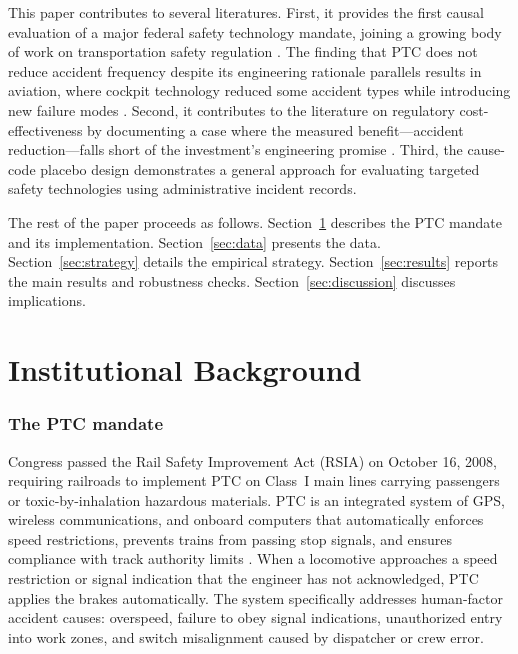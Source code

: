 \documentclass[12pt]{article}
\begin{document}
This paper contributes to several literatures. First, it provides the first causal evaluation of a major federal safety technology mandate, joining a growing body of work on transportation safety regulation \citep{Anderson2014, Auffhammer2016, Cohen2003DrunkDriving, DeAngelo2017, Greenstone2002}. The finding that PTC does not reduce accident frequency despite its engineering rationale parallels results in aviation, where cockpit technology reduced some accident types while introducing new failure modes \citep{Rankin1997CRM}. Second, it contributes to the literature on regulatory cost-effectiveness by documenting a case where the measured benefit---accident reduction---falls short of the investment's engineering promise \citep{Viscusi1992RiskRegulation, Hahn2005CostBenefit}. Third, the cause-code placebo design demonstrates a general approach for evaluating targeted safety technologies using administrative incident records.

The rest of the paper proceeds as follows. Section~\ref{sec:background} describes the PTC mandate and its implementation. Section~\ref{sec:data} presents the data. Section~\ref{sec:strategy} details the empirical strategy. Section~\ref{sec:results} reports the main results and robustness checks. Section~\ref{sec:discussion} discusses implications.


\section{Institutional Background}
\label{sec:background}

\subsubsection*{The PTC mandate} Congress passed the Rail Safety Improvement Act (RSIA) on October 16, 2008, requiring railroads to implement PTC on Class~I main lines carrying passengers or toxic-by-inhalation hazardous materials. PTC is an integrated system of GPS, wireless communications, and onboard computers that automatically enforces speed restrictions, prevents trains from passing stop signals, and ensures compliance with track authority limits \citep{FRA2010PTC}. When a locomotive approaches a speed restriction or signal indication that the engineer has not acknowledged, PTC applies the brakes automatically. The system specifically addresses human-factor accident causes: overspeed, failure to obey signal indications, unauthorized entry into work zones, and switch misalignment caused by dispatcher or crew error.
\end{document}
